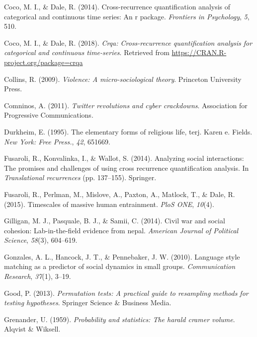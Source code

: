 \documentclass[english,man]{apa6}
\begin{document}
\leavevmode\hypertarget{ref-coco2014cross}{}%
Coco, M. I., \& Dale, R. (2014). Cross-recurrence quantification analysis of categorical and continuous time series: An r package. \emph{Frontiers in Psychology}, \emph{5}, 510.

\leavevmode\hypertarget{ref-R-crqa}{}%
Coco, M. I., \& Dale, R. (2018). \emph{Crqa: Cross-recurrence quantification analysis for categorical and continuous time-series}. Retrieved from \url{https://CRAN.R-project.org/package=crqa}

\leavevmode\hypertarget{ref-collins2009violence}{}%
Collins, R. (2009). \emph{Violence: A micro-sociological theory}. Princeton University Press.

\leavevmode\hypertarget{ref-comninos2011twitter}{}%
Comninos, A. (2011). \emph{Twitter revolutions and cyber crackdowns}. Association for Progressive Communications.

\leavevmode\hypertarget{ref-durkheim1995elementary}{}%
Durkheim, E. (1995). The elementary forms of religious life, terj. Karen e. Fields. \emph{New York: Free Press.}, \emph{42}, 651669.

\leavevmode\hypertarget{ref-fusaroli2014analyzing}{}%
Fusaroli, R., Konvalinka, I., \& Wallot, S. (2014). Analyzing social interactions: The promises and challenges of using cross recurrence quantification analysis. In \emph{Translational recurrences} (pp. 137--155). Springer.

\leavevmode\hypertarget{ref-fusaroli2015timescales}{}%
Fusaroli, R., Perlman, M., Mislove, A., Paxton, A., Matlock, T., \& Dale, R. (2015). Timescales of massive human entrainment. \emph{PloS ONE}, \emph{10}(4).

\leavevmode\hypertarget{ref-gilligan2014civil}{}%
Gilligan, M. J., Pasquale, B. J., \& Samii, C. (2014). Civil war and social cohesion: Lab-in-the-field evidence from nepal. \emph{American Journal of Political Science}, \emph{58}(3), 604--619.

\leavevmode\hypertarget{ref-gonzales2010language}{}%
Gonzales, A. L., Hancock, J. T., \& Pennebaker, J. W. (2010). Language style matching as a predictor of social dynamics in small groups. \emph{Communication Research}, \emph{37}(1), 3--19.

\leavevmode\hypertarget{ref-good2013permutation}{}%
Good, P. (2013). \emph{Permutation tests: A practical guide to resampling methods for testing hypotheses}. Springer Science \& Business Media.

\leavevmode\hypertarget{ref-grenander1959probability}{}%
Grenander, U. (1959). \emph{Probability and statistics: The harald cramer volume}. Alqvist \& Wiksell.
\end{document}

